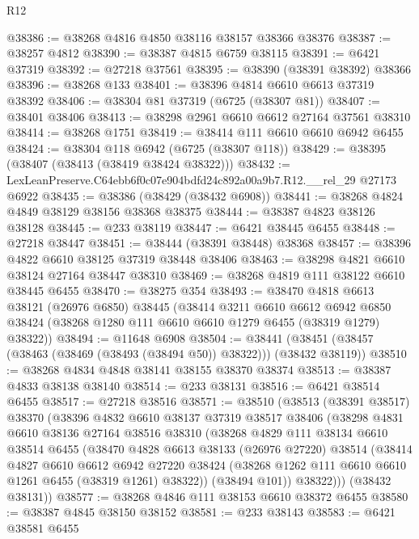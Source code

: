 \begin{lexlean}{R12}
\begin{coremodule}
@38386 := @38268 @4816 @4850 @38116 @38157 @38366 @38376
@38387 := @38257 @4812
@38390 := @38387 @4815 @6759 @38115
@38391 := @6421 @37319
@38392 := @27218 @37561
@38395 := @38390 (@38391 @38392) @38366
@38396 := @38268 @133
@38401 := @38396 @4814 @6610 @6613 @37319 @38392
@38406 := @38304 @81 @37319 (@6725 (@38307 @81))
@38407 := @38401 @38406
@38413 := @38298 @2961 @6610 @6612 @27164 @37561 @38310
@38414 := @38268 @1751
@38419 := @38414 @111 @6610 @6610 @6942 @6455
@38424 := @38304 @118 @6942 (@6725 (@38307 @118))
@38429 := @38395 (@38407 (@38413 (@38419 @38424 @38322)))
@38432 := LexLeanPreserve.C64ebb6f0c07e904bdfd24c892a00a9b7.R12.__rel_29 @27173 @6922
@38435 := @38386 (@38429 (@38432 @6908))
@38441 := @38268 @4824 @4849 @38129 @38156 @38368 @38375
@38444 := @38387 @4823 @38126 @38128
@38445 := @233 @38119
@38447 := @6421 @38445 @6455
@38448 := @27218 @38447
@38451 := @38444 (@38391 @38448) @38368
@38457 := @38396 @4822 @6610 @38125 @37319 @38448 @38406
@38463 := @38298 @4821 @6610 @38124 @27164 @38447 @38310
@38469 := @38268 @4819 @111 @38122 @6610 @38445 @6455
@38470 := @38275 @354
@38493 := @38470
    @4818
    @6613
    @38121
    (@26976 @6850)
    @38445
    (@38414
      @3211
      @6610
      @6612
      @6942
      @6850
      @38424
      (@38268 @1280 @111 @6610 @6610 @1279 @6455 (@38319 @1279) @38322))
@38494 := @11648 @6908
@38504 := @38441 (@38451 (@38457 (@38463 (@38469 (@38493 (@38494 @50)) @38322))) (@38432 @38119))
@38510 := @38268 @4834 @4848 @38141 @38155 @38370 @38374
@38513 := @38387 @4833 @38138 @38140
@38514 := @233 @38131
@38516 := @6421 @38514 @6455
@38517 := @27218 @38516
@38571 := @38510
    (@38513
      (@38391 @38517)
      @38370
      (@38396
        @4832
        @6610
        @38137
        @37319
        @38517
        @38406
        (@38298
          @4831
          @6610
          @38136
          @27164
          @38516
          @38310
          (@38268
            @4829
            @111
            @38134
            @6610
            @38514
            @6455
            (@38470
              @4828
              @6613
              @38133
              (@26976 @27220)
              @38514
              (@38414
                @4827
                @6610
                @6612
                @6942
                @27220
                @38424
                (@38268 @1262 @111 @6610 @6610 @1261 @6455 (@38319 @1261) @38322))
              (@38494 @101))
            @38322)))
      (@38432 @38131))
@38577 := @38268 @4846 @111 @38153 @6610 @38372 @6455
@38580 := @38387 @4845 @38150 @38152
@38581 := @233 @38143
@38583 := @6421 @38581 @6455

\end{coremodule}
\end{lexlean}
